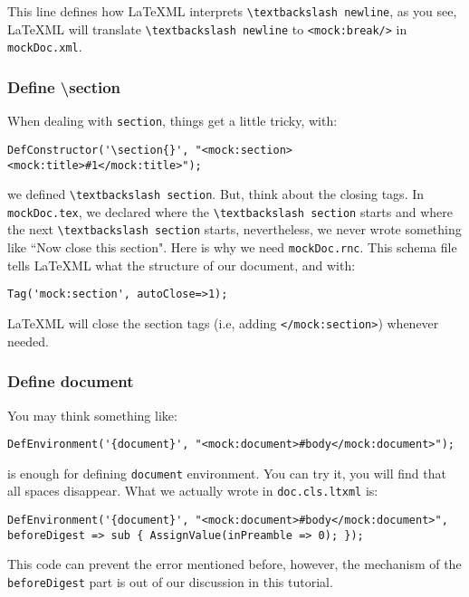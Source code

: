 \documentclass[a4paper]{article}
\def\latexml{{\LaTeX}ML\xspace}
\begin{document}
 This line defines how \latexml interprets \lstinline|\textbackslash newline|, as you see, \latexml will translate \lstinline|\textbackslash newline| to \lstinline|<mock:break/>| in \lstinline|mockDoc.xml|.

\subsubsection{Define \textbackslash section}
 When dealing with \lstinline|section|, things get a little tricky, with:
\begin{lstlisting}
DefConstructor('\section{}', "<mock:section><mock:title>#1</mock:title>");
\end{lstlisting}
we defined \lstinline|\textbackslash section|. But, think about the closing tags. In \lstinline|mockDoc.tex|, we declared where the \lstinline|\textbackslash section| starts and where the next \lstinline|\textbackslash section| starts, nevertheless, we never wrote something like ``Now close this section". Here is why we need \lstinline|mockDoc.rnc|. This schema file tells \latexml what the structure of our document, and with:
\begin{lstlisting}
Tag('mock:section', autoClose=>1);
\end{lstlisting}
\latexml will close the section tags (i.e, adding \lstinline|</mock:section>|) whenever needed.

\subsubsection{Define document}
You may think something like:
\begin{lstlisting}
DefEnvironment('{document}', "<mock:document>#body</mock:document>");
\end{lstlisting}
is enough for defining \lstinline|document| environment. You can try it, you will find that all spaces disappear. What we actually wrote in \lstinline|doc.cls.ltxml| is:
\begin{lstlisting}
DefEnvironment('{document}', "<mock:document>#body</mock:document>", beforeDigest => sub { AssignValue(inPreamble => 0); });
\end{lstlisting}
This code can prevent the error mentioned before, however, the mechanism of the \lstinline|beforeDigest| part is out of our discussion in this tutorial.
\end{document}
